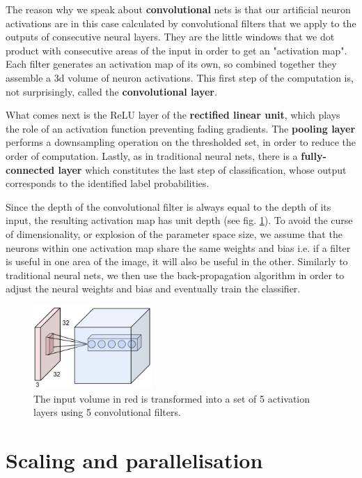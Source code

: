 \documentclass[a4paper, 12pt]{article}
\numberwithin{equation}{section}
\begin{document}
	The reason why we speak about \textbf{convolutional} nets \cite{stanford2016convnets} is that our artificial neuron activations are in this case calculated by convolutional filters that we apply to the outputs of consecutive neural layers. They are the little windows that we dot product with consecutive areas of the input in order to get an "activation map". Each filter generates an activation map of its own, so combined together they assemble a 3d volume of neuron activations. This first step of the computation is, not surprisingly, called the \textbf{convolutional layer}.

	What comes next is the ReLU layer of the \textbf{rectified linear unit}, which plays the role of an activation function preventing fading gradients.
	The \textbf{pooling layer} performs a downsampling operation on the thresholded set, in order to reduce the order of computation.
	Lastly, as in traditional neural nets, there is  a \textbf{fully-connected layer} which constitutes the last step of classification, whose output corresponds to the identified label probabilities.

	Since the depth of the convolutional filter is always equal to the depth of its input, the resulting activation map has unit depth (see fig. \ref{fig:conv_net}). To avoid the curse of dimensionality, or explosion of the parameter space size, we assume that the neurons within one activation map share the same weights and bias i.e. if a filter is useful in one area of the image, it will also be useful in the other. Similarly to traditional neural nets, we then use the back-propagation algorithm in order to adjust the neural weights and bias and eventually train the classifier.

	\begin{figure}[!h]
		\centering
		\includegraphics[page=1,width=0.40\textwidth]{depthcol.jpeg}
		\caption{\label{fig:conv_net}{The input volume in red is transformed into a set of 5 activation layers using 5 convolutional filters. \cite{stanford2016convnets}}}
	\end{figure}

	\section{Scaling and parallelisation}
\end{document}
